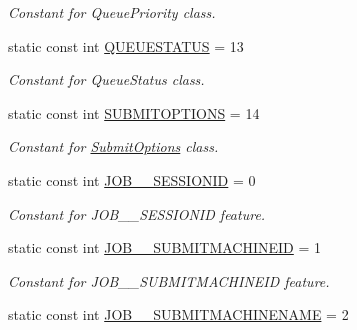 \begin{DoxyCompactItemize}
\begin{DoxyCompactList}\small\item\em Constant for QueuePriority class. \item\end{DoxyCompactList}\item 
\hypertarget{classTMS__Data_1_1TMS__DataPackage_a8f9a6acd74f178d606c3f5bf4fdcea9b}{
static const int \hyperlink{classTMS__Data_1_1TMS__DataPackage_a8f9a6acd74f178d606c3f5bf4fdcea9b}{QUEUESTATUS} = 13}
\label{classTMS__Data_1_1TMS__DataPackage_a8f9a6acd74f178d606c3f5bf4fdcea9b}

\begin{DoxyCompactList}\small\item\em Constant for QueueStatus class. \item\end{DoxyCompactList}\item 
\hypertarget{classTMS__Data_1_1TMS__DataPackage_a4cae93d6bd93116993a7486270e51442}{
static const int \hyperlink{classTMS__Data_1_1TMS__DataPackage_a4cae93d6bd93116993a7486270e51442}{SUBMITOPTIONS} = 14}
\label{classTMS__Data_1_1TMS__DataPackage_a4cae93d6bd93116993a7486270e51442}

\begin{DoxyCompactList}\small\item\em Constant for \hyperlink{classTMS__Data_1_1SubmitOptions}{SubmitOptions} class. \item\end{DoxyCompactList}\item 
\hypertarget{classTMS__Data_1_1TMS__DataPackage_a2f8f09bee40aaf88f3824acc2d06a6dc}{
static const int \hyperlink{classTMS__Data_1_1TMS__DataPackage_a2f8f09bee40aaf88f3824acc2d06a6dc}{JOB\_\-\_\-SESSIONID} = 0}
\label{classTMS__Data_1_1TMS__DataPackage_a2f8f09bee40aaf88f3824acc2d06a6dc}

\begin{DoxyCompactList}\small\item\em Constant for JOB\_\-\_\-SESSIONID feature. \item\end{DoxyCompactList}\item 
\hypertarget{classTMS__Data_1_1TMS__DataPackage_ad9ed25e5ebc6095026708532da9c6ec4}{
static const int \hyperlink{classTMS__Data_1_1TMS__DataPackage_ad9ed25e5ebc6095026708532da9c6ec4}{JOB\_\-\_\-SUBMITMACHINEID} = 1}
\label{classTMS__Data_1_1TMS__DataPackage_ad9ed25e5ebc6095026708532da9c6ec4}

\begin{DoxyCompactList}\small\item\em Constant for JOB\_\-\_\-SUBMITMACHINEID feature. \item\end{DoxyCompactList}\item 
\hypertarget{classTMS__Data_1_1TMS__DataPackage_a82e4813e3290c83687915a341a763866}{
static const int \hyperlink{classTMS__Data_1_1TMS__DataPackage_a82e4813e3290c83687915a341a763866}{JOB\_\-\_\-SUBMITMACHINENAME} = 2}
\label{classTMS__Data_1_1TMS__DataPackage_a82e4813e3290c83687915a341a763866}


\end{DoxyCompactItemize}
